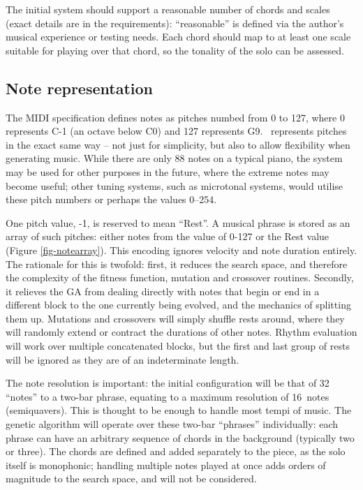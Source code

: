 The initial system should support a reasonable number of chords and scales (exact details are in the requirements): ``reasonable'' is defined via the author's musical experience or testing needs. Each chord should map to at least one scale suitable for playing over that chord, so the tonality of the solo can be assessed.

\subsection{Note representation}
\label{des-noterep}

The MIDI specification defines notes as pitches numbed from 0 to 127, where 0 represents C-1 (an octave below C0) and 127 represents G9. \jg\ represents pitches in the exact same way -- not just for simplicity, but also to allow flexibility when generating music. While there are only 88 notes on a typical piano, the system may be used for other purposes in the future, where the extreme notes may become useful; other tuning systems, such as microtonal systems, would utilise these pitch numbers or perhaps the values 0--254.


One pitch value, -1, is reserved to mean ``Rest''. A musical phrase is stored as an array of such pitches: either notes from the value of 0-127 or the Rest value (Figure \ref{fig-notearray}). This encoding ignores velocity and note duration entirely. The rationale for this is twofold: first, it reduces the search space, and therefore the complexity of the fitness function, mutation and crossover routines. Secondly, it relieves the GA from dealing directly with notes that begin or end in a different block to the one currently being evolved, and the mechanics of splitting them up. Mutations and crossovers will simply shuffle rests around, where they will randomly extend or contract the durations of other notes. Rhythm evaluation will work over multiple concatenated blocks, but the first and last group of rests will be ignored as they are of an indeterminate length.

The note resolution is important: the initial configuration will be that of 32 ``notes'' to a two-bar phrase, equating to a maximum resolution of 16\th\ notes (semiquavers). This is thought to be enough to handle most tempi of music. The genetic algorithm will operate over these two-bar ``phrases'' individually: each phrase can have an arbitrary sequence of chords in the background (typically two or three). The chords are defined and added separately to the piece, as the solo itself is monophonic; handling multiple notes played at once adds orders of magnitude to the search space, and will not be considered.

